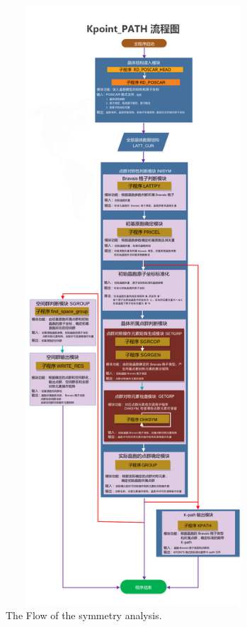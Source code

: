 \documentclass{article}      %
\begin{document}
\begin{figure}[h!]
\centering
\includegraphics[height=8.80in,width=3.75in,viewport=0 0 840 2255,clip]{VASP_sym-detail.png}
\caption{\small The Flow of the symmetry analysis.}%
\label{Fig:Fig_Flow}
\end{figure}
\end{document}
